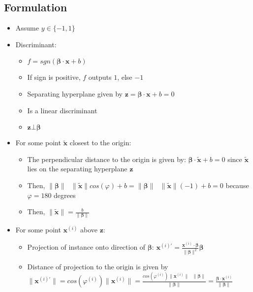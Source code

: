 \subsection*{Formulation}
\begin{itemize}
    \item Assume $y \in \{-1,1\}$
    \item Discriminant:
    \begin{itemize}
        \item $f = sgn(\boldsymbol{\beta} \cdot \boldsymbol{x} + b)$
        \item If sign is positive, $f$ outputs $1$, else $-1$
        \item Separating hyperplane given by $\boldsymbol{z} = \boldsymbol{\beta} \cdot \boldsymbol{x} + b = 0$
        \item Is a linear discriminant 
        \item $\boldsymbol{z} \bot \boldsymbol{\beta}$
    \end{itemize}
    \item For some point $\tilde{\boldsymbol{x}}$ closest to the origin:
    \begin{itemize}
        \item The perpendicular distance to the origin is given by: $\boldsymbol{\beta} \cdot\tilde{\boldsymbol{x}} + b = 0$ since $\tilde{\boldsymbol{x}}$ lies on the separating hyperplane $\boldsymbol{z}$
        \item Then, $\| \boldsymbol{\beta} \| \textrm{ } \| \tilde{\boldsymbol{x}} \| cos(\varphi) + b = \| \boldsymbol{\beta} \| \textrm{ } \| \tilde{\boldsymbol{x}} \| (-1) + b = 0$ because $\varphi = 180$ degrees
        \item Then, $\| \tilde{\boldsymbol{x}} \| = \frac{b}{\| \boldsymbol{\beta} \|}$
    \end{itemize}
    \item For some point $\boldsymbol{x}^{(i)}$ above $\boldsymbol{z}$:
    \begin{itemize}
        \item Projection of instance onto direction of $\boldsymbol{\beta}$: $\boldsymbol{x}^{(i)'} = \frac{ \boldsymbol{x}^{(i)} \cdot \boldsymbol{\beta} }{ \| \boldsymbol{\beta} \|^2 } \boldsymbol{\beta}$
        \item Distance of projection to the origin is given by $\| \boldsymbol{x}^{(i)'} \| = cos(\varphi^{(i)}) \| \boldsymbol{x}^{(i)} \| = \frac{ cos(\varphi^{(i)}) \| \boldsymbol{x}^{(i)} \| \textrm{ } \| \boldsymbol{\beta} \| }{ \| \boldsymbol{\beta} \| } = \frac{\boldsymbol{\beta} \cdot \boldsymbol{x}^{(i)}}{ \| \boldsymbol{\beta} \| }$

\end{itemize}
\end{itemize}
